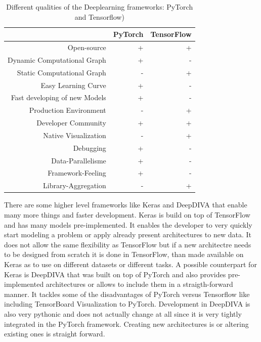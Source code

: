 \begin{table}[t] \centering
{}
\caption{Different qualities of the Deeplearning frameworks: PyTorch and Tensorflow)}
\begin{tabular}{@{}rrr@{}}
\toprule & PyTorch & TensorFlow \\
\midrule
Open-source									& + & + \\
Dynamic Computational Graph			& + & -  \\
Static Computational Graph				& - & +  \\
Easy Learning Curve							& + & -  \\
Fast developing of new Models			& + & -  \\
Production Environment					& - & + \\
Developer Community						& + & + \\
Native Visualization							& - & +  \\
Debugging										& + & -  \\
Data-Parallelisme								& + & -  \\
Framework-Feeling							& + & -  \\
Library-Aggregation							& - & +  \\

\bottomrule
\end{tabular}
\label{tbl:DeepLearningFrameworks}
\end{table}


There are some higher level frameworks like Keras \cite{keras} and DeepDIVA \cite{deepdiva} that enable many more things and faster development. Keras is build on top of TensorFlow and has many models pre-implemented. It enables the developer to very quickly start modeling a problem or apply already present architectures to new data. It does not allow the same flexibility as TensorFlow but if a new architectre needs to be designed from scratch it is done in TensorFlow, than made available on Keras as to use on different datasets or different tasks. A possible counterpart for Keras is DeepDIVA that was built on top of PyTorch and also provides pre-implemented architectures or allows to include them in a straigth-forward manner. It tackles some of the disadvantages of PyTorch versus Tensorflow like including TensorBoard Visualization to PyTorch. Development in DeepDIVA is also very pythonic and does not actually change at all since it is very tightly integrated in the PyTorch framework. Creating new architectures is or altering existing ones is straight forward.

